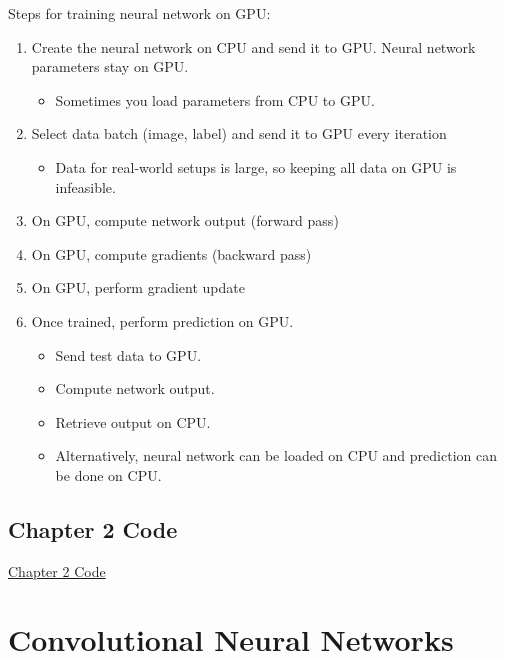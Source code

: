 \documentclass{report}
\begin{document}
\begin{concept}
    Steps for training neural network on GPU:

    \begin{enumerate}
        \item
        Create the neural network on CPU and send it to GPU. Neural network parameters stay on GPU.

        \begin{itemize}
            \item Sometimes you load parameters from CPU to GPU.
        \end{itemize}
        \item
        Select data batch (image, label) and send it to GPU every iteration

        \begin{itemize}
            \item Data for real-world setups is large, so keeping all data on GPU is infeasible.
        \end{itemize}
        \item On GPU, compute network output (forward pass)
        \item On GPU, compute gradients (backward pass)
        \item On GPU, perform gradient update
        \item
        Once trained, perform prediction on GPU.

        \begin{itemize}
            \item Send test data to GPU.
            \item Compute network output.
            \item Retrieve output on CPU.
            \item Alternatively, neural network can be loaded on CPU and prediction can be done on CPU.
        \end{itemize}
    \end{enumerate}
\end{concept}

\chapter*{Chapter 2 Code}

\href{https://drive.google.com/file/d/15kXC3cJUV63gZNfXK6JdPPuSrwQZBzI8/view?usp=sharing}{Chapter 2 Code}

\part{Convolutional Neural Networks}
\end{document}
